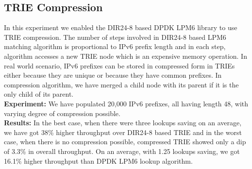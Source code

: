 \subsection{TRIE Compression}
In this experiment we enabled the DIR24-8\cite{Gupta98routinglookups} based DPDK LPM6 library to use TRIE compression. The number of steps involved in DIR24-8 based LPM6 matching algorithm is proportional to IPv6 prefix length and in each step, algorithm accesses a new TRIE node which is an expensive memory operation. In real world scenario, IPv6 prefixes can be stored in compressed form in TRIEs either because they are unique or because they have common prefixes. In compression algorithm, we have merged a child node with its parent if it is the only child of its parent.
\\
\textbf{Experiment:} We have populated 20,000 IPv6 prefixes, all having length 48, with varying degree of compression possible.
\\
\textbf{Results:} In the best case, when there were three lookups saving on an average, we have got 38\% higher throughput over DIR24-8 based TRIE and in the worst case, when there is no compression possible, compressed TRIE showed only a dip of 3.3\% in overall throughput. On an average, with 1.25 lookups saving, we got 16.1\% higher throughput than DPDK LPM6 lookup algorithm.


